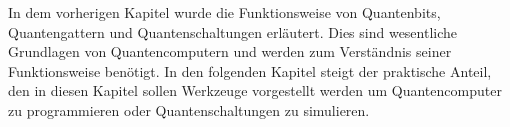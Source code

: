 In dem vorherigen Kapitel wurde die Funktionsweise von Quantenbits, Quantengattern und Quantenschaltungen erl\"autert. Dies sind wesentliche Grundlagen von Quantencomputern und werden zum Verst\"andnis seiner Funktionsweise ben\"otigt. In den folgenden Kapitel steigt der praktische Anteil, den in diesen Kapitel sollen Werkzeuge vorgestellt werden um Quantencomputer zu programmieren oder Quantenschaltungen zu simulieren.
